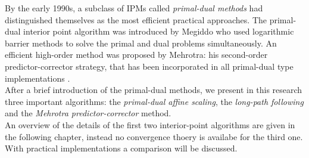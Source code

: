 \documentclass[a4paper,10 pt,titlepage,twoside]{book}
\theoremstyle{plain}
\theoremstyle{definition}
\theoremstyle{remark}
\begin{document}
By the early 1990s, a subclass of IPMs called \textit{primal-dual methods} had distinguished themselves as the most efficient practical approaches. The primal-dual interior point algorithm was introduced by Megiddo \cite{meg}  who used logarithmic barrier methods to solve
the primal and dual problems simultaneously. An efficient
high-order method was proposed by Mehrotra: his second-order predictor-corrector
strategy, that has been incorporated in all primal-dual type implementations \cite{MER} .\\ 
After a brief introduction of the primal-dual methods, we present in this research three important algorithms: the \textit{primal-dual affine scaling}, the \textit{long-path following} and the \textit{Mehrotra predictor-corrector} method.\\
An overview of the details of the first two interior-point algorithms are given in the following chapter, instead no convergence thoery is availabe for the third one. With practical implementations a comparison will be discussed.

\newpage
\end{document}
